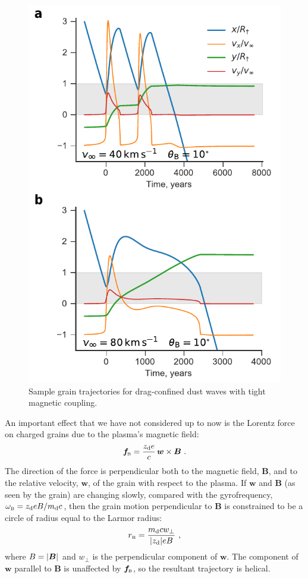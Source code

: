 \begin{figure}
  \centering
  \includegraphics[width=\linewidth]{figs/frozen-trajectories-multi}
  \caption{Sample grain trajectories for drag-confined dust waves with
    tight magnetic coupling.}
  \label{fig:frozen-trajectories}
\end{figure}

An important effect that we have not considered up to now is the
Lorentz force on charged grains due to the plasma's magnetic field:
\begin{equation}
  \label{eq:f-lorentz}
  \bm{f}\!_{\scriptscriptstyle\text{B}} = \frac{z_{\text{d}} e}{c} \, \bm{w} \times \bm{B} \ . 
\end{equation}
The direction of the force is perpendicular both to the magnetic
field, \(\bm{B}\), and to the relative velocity, \(\bm{w}\), of the
grain with respect to the plasma.  If \(\bm{w}\) and \(\bm{B}\) (as
seen by the grain) are changing slowly, compared with the
gyrofrequency, \(\omega_{\scriptscriptstyle\text{B}} = z_{\text{d}} e B / m_{\text{d}} c\), then the grain
motion perpendicular to \(\bm{B}\) is constrained to be a circle of
radius equal to the Larmor radius:
\begin{equation}
  \label{eq:Larmor}
  r_{\scriptscriptstyle\text{B}} = \frac{m_{\text{d}} c w_\perp} {\lvert z_{\text{d}}\rvert e B} \ ,
\end{equation}
where \(B = \lvert\bm{B}\rvert\) and \(w_\perp\) is the perpendicular component
of \(\bm{w}\).  The component of \(\bm{w}\) parallel to \(\bm{B}\) is
unaffected by \(\bm{f}\!_{\scriptscriptstyle\text{B}}\), so the resultant trajectory is helical.

